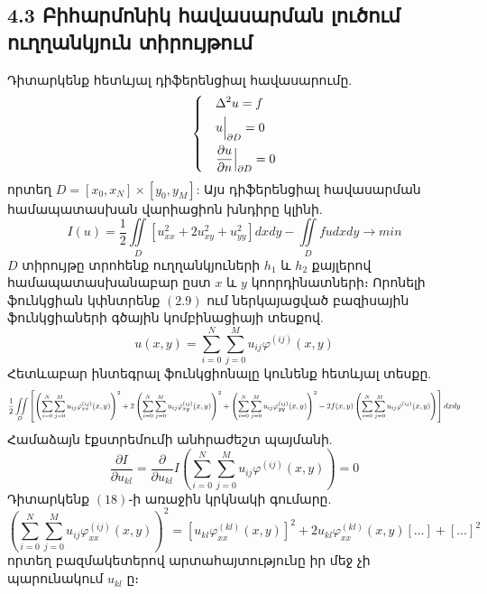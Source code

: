 \documentclass[fleqn, bachelor,subf,12pt,notitlepage]{article}
\newcommand\scalemath[2]{\scalebox{#1}{\mbox{\ensuremath{\displaystyle #2}}}}
\begin{document}
\subsection*{4.3 Բիհարմոնիկ հավասարման լուծում ուղղանկյուն տիրույթում}
Դիտարկենք հետևյալ դիֆերենցիալ հավասարումը.
\begin{equation}
\begin{dcases}
&\Delta^{2} u =f \\
&u \Big |_{\partial D} = 0\\
&\dfrac{\partial u}{\partial n} \Big |_{\partial D} = 0
\end{dcases}
\end{equation}
որտեղ $D = \left[x_{0}, x_{N}\right] \times \left[y_{0}, y_{M}\right]$:
Այս դիֆերենցիալ հավասարման  համապատասխան վարիացիոն խնդիրը կլինի.
\begin{equation}
I(u) = \frac{1}{2}\iint \limits_{D} \left[u_{xx}^{2} + 2u_{xy}^{2} + u_{yy}^{2} \right]dxdy - \iint \limits_{D} fudxdy \longrightarrow min
\end{equation}
$D$ տիրույթը տրոհենք ուղղանկյուների $h_{1}$ և $h_{2}$ քայլերով համապատասխանաբար ըստ $x$ և $y$ կոորդինատների։
Որոնելի ֆունկցիան կփնտրենք $\left(2.9\right)$ ում ներկայացված բազիսային ֆունկցիաների գծային կոմբինացիայի տեսքով.
\begin{equation}
u(x,y) = \sum_{i=0}^{N} \sum_{j=0}^{M} u_{ij}\varphi^{(ij)}(x,y)
\end{equation}
Հետևաբար ինտեգրալ ֆունկցիոնալը կունենք հետևյալ տեսքը.
\begin{equation}
$$\scalemath{0.7}{\frac{1}{2} \iint \limits_{D}\left[\left(\sum_{i=0}^{N} \sum_{j=0}^{M}u_{ij}\varphi^{(ij)}_{xx}(x,y)\right)^2 +  2\left(\sum_{i=0}^{N} \sum_{j=0}^{M}u_{ij}\varphi^{(ij)}_{xy}(x,y)\right)^2 + \left(\sum_{i=0}^{N} \sum_{j=0}^{M}u_{ij}\varphi^{(ij)}_{yy}(x,y)\right)^2-2f(x,y)\left(\sum_{i=0}^{N} \sum_{j=0}^{M}u_{ij}\varphi^{(ij)}(x,y)\right)\right]dxdy}
\end{equation}
Համաձայն էքստրեմումի անհրաժեշտ պայմանի.
\begin{equation}
\dfrac{\partial I}{ \partial u_{kl}} = \dfrac{\partial}{\partial u_{kl}} I \left(\sum_{i=0}^{N}\sum_{j=0}^{M} u_{ij}\varphi^{(ij)}(x,y)\right) = 0
\end{equation}
Դիտարկենք $\left(18\right)$֊ի առաջին կրկնակի գումարը.
$$\left(\sum_{i=0}^{N} \sum_{j=0}^{M}u_{ij}\varphi_{xx}^{(ij)}(x,y)\right)^2 = \left[u_{kl}\varphi_{xx}^{(kl)}(x,y)\right]^{2} + 2u_{kl}\varphi_{xx}^{(kl)}(x,y)[\dots] + [\dots]^2$$
\noindent որտեղ բազմակետերով արտահայտությունը իր մեջ չի պարունակում $u_{kl}$ ը։
\end{document}
